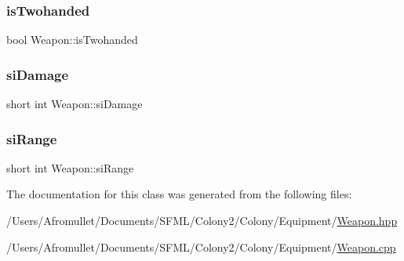 \subsubsection{\texorpdfstring{is\+Twohanded}{isTwohanded}}
{\footnotesize\ttfamily bool Weapon\+::is\+Twohanded\hspace{0.3cm}{\ttfamily [private]}}

\mbox{\label{class_weapon_aedd020151d162c99d7fc5e28f627c517}} 
\subsubsection{\texorpdfstring{si\+Damage}{siDamage}}
{\footnotesize\ttfamily short int Weapon\+::si\+Damage\hspace{0.3cm}{\ttfamily [private]}}

\mbox{\label{class_weapon_afb5789f93e22dfb039d273f0bd4480b0}} 
\subsubsection{\texorpdfstring{si\+Range}{siRange}}
{\footnotesize\ttfamily short int Weapon\+::si\+Range\hspace{0.3cm}{\ttfamily [private]}}



The documentation for this class was generated from the following files\+:\begin{DoxyCompactItemize}
\item 
/\+Users/\+Afromullet/\+Documents/\+S\+F\+M\+L/\+Colony2/\+Colony/\+Equipment/\mbox{\hyperlink{_weapon_8hpp}{Weapon.\+hpp}}\item 
/\+Users/\+Afromullet/\+Documents/\+S\+F\+M\+L/\+Colony2/\+Colony/\+Equipment/\mbox{\hyperlink{_weapon_8cpp}{Weapon.\+cpp}}\end{DoxyCompactItemize}
